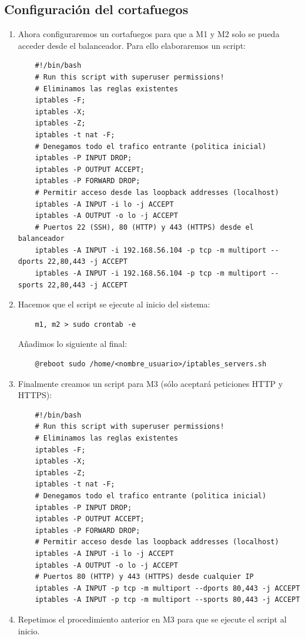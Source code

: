 \documentclass[12pt,spanish]{article}
\begin{document}
\subsection{Configuración del cortafuegos}
	\begin{enumerate}
	\item Ahora configuraremos un cortafuegos para que a M1 y M2 solo se pueda acceder desde el balanceador. Para ello elaboraremos un script:
	\begin{lstlisting}
	#!/bin/bash
	# Run this script with superuser permissions!
	# Eliminamos las reglas existentes
	iptables -F;
	iptables -X;
	iptables -Z;
	iptables -t nat -F;
	# Denegamos todo el trafico entrante (politica inicial)
	iptables -P INPUT DROP;
	iptables -P OUTPUT ACCEPT;
	iptables -P FORWARD DROP;
	# Permitir acceso desde las loopback addresses (localhost)
	iptables -A INPUT -i lo -j ACCEPT
	iptables -A OUTPUT -o lo -j ACCEPT
	# Puertos 22 (SSH), 80 (HTTP) y 443 (HTTPS) desde el balanceador
	iptables -A INPUT -i 192.168.56.104 -p tcp -m multiport --dports 22,80,443 -j ACCEPT
	iptables -A INPUT -i 192.168.56.104 -p tcp -m multiport --sports 22,80,443 -j ACCEPT
	\end{lstlisting}
	\item Hacemos que el script se ejecute al inicio del sistema:
	\begin{lstlisting}
	m1, m2 > sudo crontab -e
	\end{lstlisting}
	Añadimos lo siguiente al final:
	\begin{lstlisting}
	@reboot sudo /home/<nombre_usuario>/iptables_servers.sh
	\end{lstlisting}
	\item Finalmente creamos un script para M3 (sólo aceptará peticiones HTTP y HTTPS):
	\begin{lstlisting}
	#!/bin/bash
	# Run this script with superuser permissions!
	# Eliminamos las reglas existentes
	iptables -F;
	iptables -X;
	iptables -Z;
	iptables -t nat -F;
	# Denegamos todo el trafico entrante (politica inicial)
	iptables -P INPUT DROP;
	iptables -P OUTPUT ACCEPT;
	iptables -P FORWARD DROP;
	# Permitir acceso desde las loopback addresses (localhost)
	iptables -A INPUT -i lo -j ACCEPT
	iptables -A OUTPUT -o lo -j ACCEPT
	# Puertos 80 (HTTP) y 443 (HTTPS) desde cualquier IP
	iptables -A INPUT -p tcp -m multiport --dports 80,443 -j ACCEPT
	iptables -A INPUT -p tcp -m multiport --sports 80,443 -j ACCEPT
	\end{lstlisting}
	\item Repetimos el procedimiento anterior en M3 para que se ejecute el script al inicio.
\end{enumerate}
\end{document}
